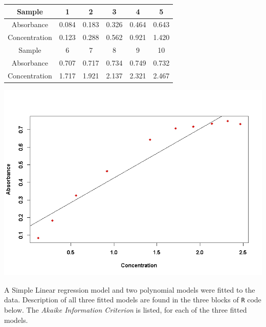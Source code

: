 \documentclass[a4paper,12pt]{article}
\begin{document}

\begin{center}
	\begin{tabular}{|c||c|c|c|c|c|}
		\hline
		Sample & 1 & 2 & 3 & 4 & 5 \\ \hline
		Absorbance & 0.084& 0.183& 0.326& 0.464& 0.643\\
		Concentration & 0.123& 0.288& 0.562& 0.921& 1.420\\ \hline
		Sample & 6 & 7 & 8 & 9 & 10 \\ \hline
		Absorbance & 0.707& 0.717& 0.734 &0.749 &0.732\\
		Concentration & 1.717& 1.921& 2.137 &2.321&2.467\\
		\hline
	\end{tabular}
\end{center}

\begin{center}
	\includegraphics[scale=0.55]{images/ExamQ3plot}
\end{center}

\noindent A Simple Linear regression model and two polynomial models were fitted to the data. Description of all three fitted models are found in the three blocks of \texttt{R} code below. The \emph{Akaike Information Criterion} is listed, for each of the three fitted models.
\end{document}
